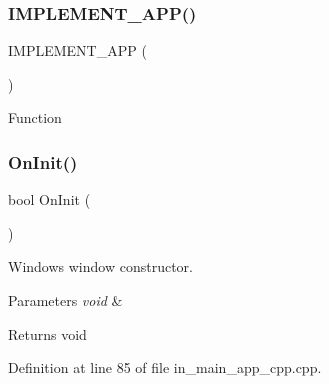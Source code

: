\subsubsection{IMPLEMENT\_APP()}
{\footnotesize\ttfamily I\+M\+P\+L\+E\+M\+E\+N\+T\+\_\+\+A\+PP (\begin{DoxyParamCaption}\item[{\textbf{ main\+\_\+app}}]{ }\end{DoxyParamCaption})}

Function \mbox{\label{group___main_gaa632f0b3197adeb7777ee5d14a2ac639}} 
\subsubsection{OnInit()}
{\footnotesize\ttfamily bool On\+Init (\begin{DoxyParamCaption}{ }\end{DoxyParamCaption})\hspace{0.3cm}{\ttfamily [virtual]}}



Windows window constructor. 


\begin{DoxyParams}{Parameters}
{\em void} & \\
\hline
\end{DoxyParams}
\begin{DoxyReturn}{Returns}
void 
\end{DoxyReturn}


Definition at line 85 of file in\+\_\+main\+\_\+app\+\_\+cpp.\+cpp.

